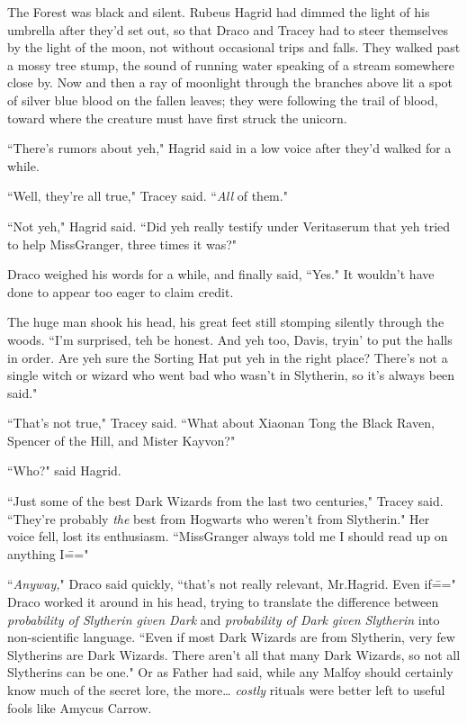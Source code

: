 The Forest was black and silent. Rubeus Hagrid had dimmed the light of his umbrella after they'd set out, so that Draco and Tracey had to steer themselves by the light of the moon, not without occasional trips and falls. They walked past a mossy tree stump, the sound of running water speaking of a stream somewhere close by. Now and then a ray of moonlight through the branches above lit a spot of silver blue blood on the fallen leaves; they were following the trail of blood, toward where the creature must have first struck the unicorn.

``There's rumors about yeh," Hagrid said in a low voice after they'd walked for a while.

``Well, they're all true," Tracey said. ``\emph{All} of them."

``Not yeh," Hagrid said. ``Did yeh really testify under Veritaserum that yeh tried to help Miss\?Granger, three times it was?"

Draco weighed his words for a while, and finally said, ``Yes." It wouldn't have done to appear too eager to claim credit.

The huge man shook his head, his great feet still stomping silently through the woods. ``I'm surprised, teh be honest. And yeh too, Davis, tryin' to put the halls in order. Are yeh sure the Sorting Hat put yeh in the right place? There's not a single witch or wizard who went bad who wasn't in Slytherin, so it's always been said."

``That's not true," Tracey said. ``What about Xiaonan Tong the Black Raven, Spencer of the Hill, and Mister Kayvon?"

``Who?" said Hagrid.

``Just some of the best Dark Wizards from the last two centuries," Tracey said. ``They're probably \emph{the} best from Hogwarts who weren't from Slytherin." Her voice fell, lost its enthusiasm. ``Miss\?Granger always told me I should read up on anything I\==="

``\emph{Anyway,}" Draco said quickly, ``that's not really relevant, Mr.\?Hagrid. Even if\===" Draco worked it around in his head, trying to translate the difference between \emph{probability of Slytherin given Dark} and \emph{probability of Dark given Slytherin} into non-scientific language. ``Even if most Dark Wizards are from Slytherin, very few Slytherins are Dark Wizards. There aren't all that many Dark Wizards, so not all Slytherins can be one." Or as Father had said, while any Malfoy should certainly know much of the secret lore, the more{\ldots} \emph{costly} rituals were better left to useful fools like Amycus Carrow.

